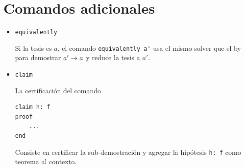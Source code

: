 \section{Comandos adicionales}

\begin{itemize}
    \item \lstinline{equivalently}
    
    Si la tesis es $a$, el comando \lstinline{equivalently a'} usa el mismo solver que el by para demostrar $a' \to a$ y reduce la tesis a $a'$.

    \item \lstinline{claim}
    
    La certificación del comando
    \begin{lstlisting}[numbers=none]
claim h: f
proof
    ...
end
    \end{lstlisting}
    
    Consiste en certificar la sub-demostración y agregar la hipótesis \lstinline{h: f} como teorema al contexto.

\end{itemize}
